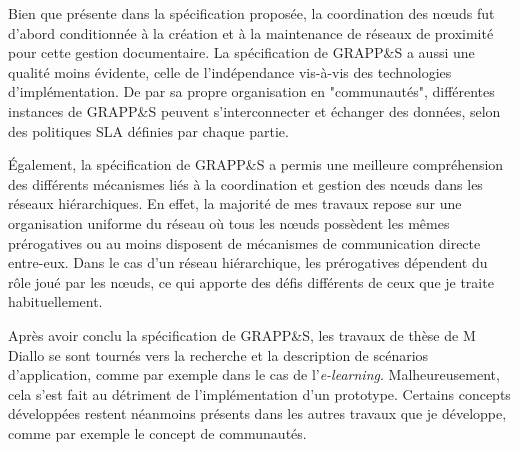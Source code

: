 Bien que présente dans la spécification proposée, la coordination des n{\oe}uds fut d'abord conditionnée à la création et à la maintenance de réseaux de proximité pour cette gestion documentaire. La spécification de GRAPP\&S a aussi une qualité moins évidente, celle de l'indépendance vis-à-vis des technologies d'implémentation. De par sa propre organisation en "communautés", différentes instances de GRAPP\&S peuvent s'interconnecter et échanger des données, selon des politiques SLA définies par chaque partie.   

Également, la spécification de GRAPP\&S a permis une meilleure compréhension des différents mécanismes liés à la coordination et gestion des n{\oe}uds dans les réseaux hiérarchiques. En effet, la majorité de mes travaux repose sur une organisation uniforme du réseau où tous les n{\oe}uds possèdent les mêmes prérogatives ou au moins disposent de mécanismes de communication directe entre-eux. Dans le cas d'un réseau hiérarchique, les prérogatives dépendent du rôle joué par les n{\oe}uds, ce qui apporte des défis différents de ceux que je traite habituellement. 

Après avoir conclu la spécification de GRAPP\&S, les travaux de thèse de M Diallo se sont tournés vers la recherche et la description de scénarios d'application, comme par exemple dans le cas de l'\textit{e-learning}. Malheureusement, cela s'est fait au détriment de l'implémentation d'un prototype.  Certains concepts développées restent néanmoins présents dans les autres travaux que je développe, comme par exemple le concept de communautés. 